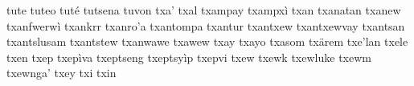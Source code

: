 \documentclass[a4paper]{article}
\begin{document}
tute\hspace{2mm}
tuteo\hspace{2mm}
tuté\hspace{2mm}
tutsena\hspace{2mm}
tuvon\hspace{2mm}
txa'\hspace{2mm}
txal\hspace{2mm}
txampay\hspace{2mm}
txampxì\hspace{2mm}
txan\hspace{2mm}
txanatan\hspace{2mm}
txanew\hspace{2mm}
txanfwerwì\hspace{2mm}
txankrr\hspace{2mm}
txanro'a\hspace{2mm}
txantompa\hspace{2mm}
txantur\hspace{2mm}
txantxew\hspace{2mm}
txantxewvay\hspace{2mm}
txantsan\hspace{2mm}
txantslusam\hspace{2mm}
txantstew\hspace{2mm}
txanwawe\hspace{2mm}
txawew\hspace{2mm}
txay\hspace{2mm}
txayo\hspace{2mm}
txasom\hspace{2mm}
txärem\hspace{2mm}
txe'lan\hspace{2mm}
txele\hspace{2mm}
txen\hspace{2mm}
txep\hspace{2mm}
txepìva\hspace{2mm}
txeptseng\hspace{2mm}
txeptsyìp\hspace{2mm}
txepvi\hspace{2mm}
txew\hspace{2mm}
txewk\hspace{2mm}
txewluke\hspace{2mm}
txewm\hspace{2mm}
txewnga'\hspace{2mm}
txey\hspace{2mm}
txi\hspace{2mm}
txin\hspace{2mm}
\end{document}
